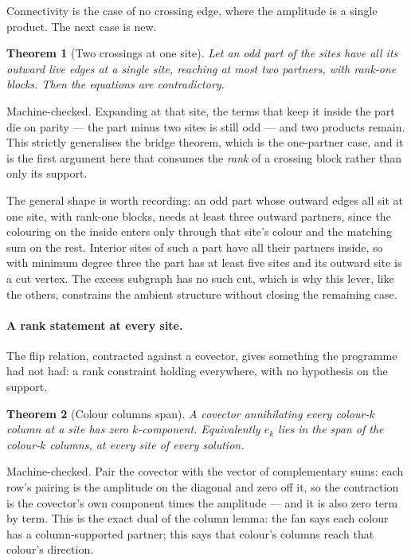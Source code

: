 \documentclass[11pt]{article}
\newtheorem{theorem}{Theorem}[section]
\theoremstyle{definition}
\theoremstyle{remark}
\begin{document}
Connectivity is the case of no crossing edge, where the amplitude is a single product. The next
case is new.

\begin{theorem}[Two crossings at one site]\label{thm:twocross}
Let an odd part of the sites have all its outward live edges at a single site, reaching at most
two partners, with rank-one blocks. Then the equations are contradictory.
\end{theorem}

Machine-checked. Expanding at that site, the terms that keep it inside the part die on parity
--- the part minus two sites is still odd --- and two products remain. This strictly generalises
the bridge theorem, which is the one-partner case, and it is the first argument here that
consumes the \emph{rank} of a crossing block rather than only its support.

The general shape is worth recording: an odd part whose outward edges all sit at one site, with
rank-one blocks, needs at least three outward partners, since the colouring on the inside enters
only through that site's colour and the matching sum on the rest. Interior sites of such a part
have all their partners inside, so with minimum degree three the part has at least five sites
and its outward site is a cut vertex. The excess subgraph has no such cut, which is why this
lever, like the others, constrains the ambient structure without closing the remaining case.

\paragraph{A rank statement at every site.} The flip relation, contracted against a covector,
gives something the programme had not had: a rank constraint holding everywhere, with no
hypothesis on the support.

\begin{theorem}[Colour columns span]\label{thm:colspan}
A covector annihilating every colour-$k$ column at a site has zero $k$-component. Equivalently
$e_k$ lies in the span of the colour-$k$ columns, at every site of every solution.
\end{theorem}

Machine-checked. Pair the covector with the vector of complementary sums: each row's pairing is
the amplitude on the diagonal and zero off it, so the contraction is the covector's own
component times the amplitude --- and it is also zero term by term. This is the exact dual of
the column lemma: the fan says each colour has a column-supported partner; this says that
colour's columns reach that colour's direction.
\end{document}
